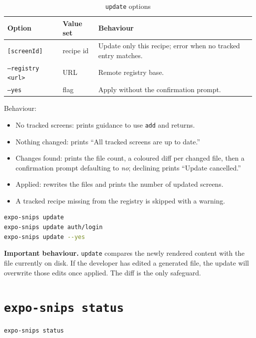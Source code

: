 \begin{longtable}{p{3.4cm}p{2.9cm}p{8.5cm}}
\caption{\texttt{update} options}\\
\toprule
\textbf{Option} & \textbf{Value set} & \textbf{Behaviour} \\
\midrule

\texttt{[screenId]} & recipe id & Update only this recipe; error when no tracked
entry matches. \\
\texttt{--registry <url>} & URL & Remote registry base. \\
\texttt{--yes} & flag & Apply without the confirmation prompt. \\
\bottomrule
\end{longtable}

Behaviour:

\begin{itemize}
  \item No tracked screens: prints guidance to use \texttt{add} and returns.
  \item Nothing changed: prints ``All tracked screens are up to date.''
  \item Changes found: prints the file count, a coloured diff per changed file, then
        a confirmation prompt defaulting to \emph{no}; declining prints ``Update
        cancelled.''
  \item Applied: rewrites the files and prints the number of updated screens.
  \item A tracked recipe missing from the registry is skipped with a warning.
\end{itemize}

\begin{lstlisting}[language=bash]
expo-snips update
expo-snips update auth/login
expo-snips update --yes
\end{lstlisting}

\textbf{Important behaviour.} \texttt{update} compares the newly rendered content
with the file currently on disk. If the developer has edited a generated file, the
update will overwrite those edits once applied. The diff is the only safeguard.

\section{\texttt{expo-snips status}}

\begin{lstlisting}[language=bash]
expo-snips status
\end{lstlisting}

